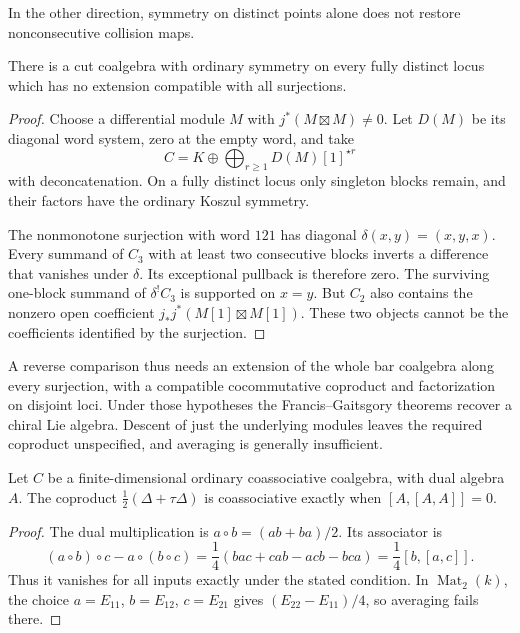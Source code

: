 In the other direction, symmetry on distinct points alone
does not restore nonconsecutive collision maps.

\begin{proposition}\label{e1f:prop:descent}
There is a cut coalgebra with ordinary symmetry on every
fully distinct locus which has no extension compatible
with all surjections.
\end{proposition}

\begin{proof}
Choose a differential module \(M\) with
\(j^*(M\boxtimes M)\ne0\). Let \(D(M)\) be its
diagonal word system, zero at the empty word, and take
\[
 C=K\oplus\bigoplus_{r\geq1}D(M)[1]^{\star r}
\]
with deconcatenation. On a fully distinct locus only
singleton blocks remain, and their factors have the
ordinary Koszul symmetry.

The nonmonotone surjection with word \(121\) has diagonal
\(\delta(x,y)=(x,y,x)\). Every summand of \(C_3\) with
at least two consecutive blocks inverts a difference that
vanishes under \(\delta\). Its exceptional pullback is
therefore zero. The surviving one-block summand of
\(\delta^!C_3\) is supported on \(x=y\).
But \(C_2\) also contains the nonzero open coefficient
\(j_*j^*(M[1]\boxtimes M[1])\). These two objects cannot
be the coefficients identified by the surjection.
\end{proof}

A reverse comparison thus needs an extension of the whole
bar coalgebra along every surjection, with a compatible
cocommutative coproduct and factorization on disjoint
loci. Under those hypotheses the Francis--Gaitsgory
theorems recover a chiral Lie algebra. Descent of just
the underlying modules leaves the required coproduct
unspecified, and averaging is generally insufficient.

\begin{theorem}\label{e1f:thm:average}
Let \(C\) be a finite-dimensional ordinary coassociative
coalgebra, with dual algebra \(A\). The coproduct
\(\tfrac12(\Delta+\tau\Delta)\) is coassociative exactly
when \([A,[A,A]]=0\).
\end{theorem}

\begin{proof}
The dual multiplication is \(a\circ b=(ab+ba)/2\).
Its associator is
\[
 (a\circ b)\circ c-a\circ(b\circ c)
 =\frac14(bac+cab-acb-bca)=\frac14[b,[a,c]].
\]
Thus it vanishes for all inputs exactly under the stated
condition. In \(\operatorname{Mat}_2(k)\), the choice
\(a=E_{11}\), \(b=E_{12}\), \(c=E_{21}\) gives
\((E_{22}-E_{11})/4\), so averaging fails there.
\end{proof}

